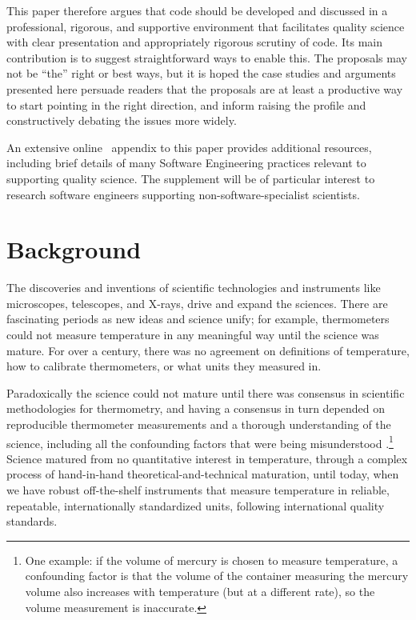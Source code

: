 \documentclass{comjnl}
\begin{document}
This paper therefore argues that code should be developed and discussed in a professional, rigorous, and supportive environment that facilitates quality science with clear presentation and appropriately rigorous scrutiny of code. Its main contribution is to suggest straightforward ways to enable this. The proposals may not be ``the'' right or best ways, but it is hoped the case studies and arguments presented here persuade readers that the proposals are at least a productive way to start pointing in the right direction, and inform raising the profile and constructively debating the issues more widely. 

An extensive online \supplement\ appendix to this paper provides additional resources, including brief details of many Software Engineering practices relevant to supporting quality science. The supplement will be of particular interest to research software engineers supporting non-software-specialist scientists.

\section{Background}
The discoveries and inventions of scientific technologies and instruments like microscopes, telescopes, and X-rays, drive and expand the sciences. There are fascinating periods as new ideas and science unify; for example, thermometers could not measure temperature in any meaningful way until the science was mature. For over a century, there was no agreement on definitions of temperature, how to calibrate thermometers, or what units they measured in. 

Paradoxically the science could not mature until there was consensus in scientific methodologies for thermometry, and having a consensus in turn depended on reproducible thermometer measurements and a thorough understanding of the science, including all the confounding factors that were being misunderstood \cite{temperature}.\footnote{One example: if the volume of mercury is chosen to measure temperature, a confounding factor is that the volume of the container measuring the mercury volume also increases with temperature (but at a different rate), so the volume measurement is inaccurate.} 
Science matured from no quantitative interest in temperature, through a complex process of hand-in-hand theoretical-and-technical maturation, until today, when we have robust off-the-shelf instruments that measure temperature in reliable, repeatable, internationally standardized units, following international quality standards.
\end{document}

